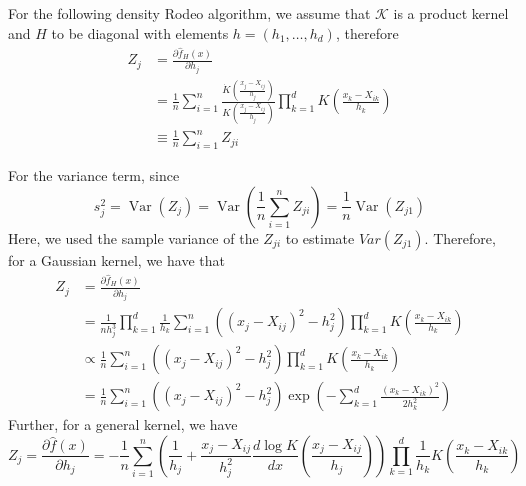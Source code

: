 For the following density Rodeo algorithm, we assume that $\mathcal{K}$ is a product kernel and $H$ to be diagonal with elements $h = (h_1, \dots, h_d)$, therefore
\begin{equation}
    \begin{split} 
        Z_{j} 
        & =\frac{\partial \hat{f}_{H}(x)}{\partial h_{j}} \\ 
        &=\frac{1}{n} \sum_{i=1}^{n} \frac{\dot{K}\left(\frac{x_{j}-X_{i j}}{h_{j}}\right)}{K\left(\frac{x_{j}-X_{i j}}{h_{j}}\right)} \prod_{k=1}^{d} K\left(\frac{x_{k}-X_{i k}}{h_{k}}\right) \\ 
        & \equiv \frac{1}{n} \sum_{i=1}^{n} Z_{j i} 
    \end{split}
\end{equation}

For the variance term, since 
\begin{equation}
    \label{eq:sj}
    s_{j}^{2}=\operatorname{Var}\left(Z_{j}\right)=\operatorname{Var}\left(\frac{1}{n} \sum_{i=1}^{n} Z_{j i}\right)=\frac{1}{n} \operatorname{Var}\left(Z_{j 1}\right)
\end{equation}
Here, we used the sample variance of the $Z_{ji}$ to estimate $Var(Z_{j1})$. 
Therefore, for a Gaussian kernel, we have that
\begin{equation}
    \label{eq:zj}
    \begin{split} 
        Z_{j} 
        &=\frac{\partial \hat{f}_{H}(x)}{\partial h_{j}} \\ 
        &=\frac{1}{n h_{j}^{3}} \prod_{k=1}^{d} \frac{1}{h_{k}} \sum_{i=1}^{n}\left(\left(x_{j}-X_{i j}\right)^{2}-h_{j}^{2}\right) \prod_{k=1}^{d} K\left(\frac{x_{k}-X_{i k}}{h_{k}}\right) \\ 
        & \propto \frac{1}{n} \sum_{i=1}^{n}\left(\left(x_{j}-X_{i j}\right)^{2}-h_{j}^{2}\right) \prod_{k=1}^{d} K\left(\frac{x_{k}-X_{i k}}{h_{k}}\right) \\ 
        &=\frac{1}{n} \sum_{i=1}^{n}\left(\left(x_{j}-X_{i j}\right)^{2}-h_{j}^{2}\right) \exp \left(-\sum_{k=1}^{d} \frac{\left(x_{k}-X_{i k}\right)^{2}}{2 h_{k}^{2}}\right) 
    \end{split}
\end{equation}
Further, for a general kernel, we have
\begin{equation}
    Z_{j} 
    = \frac{\partial \hat{f}(x)}{\partial h_{j}}
    = - \frac{1}{n} \sum_{i=1}^{n}\left(\frac{1}{h_{j}}+\frac{x_{j}-X_{i j}}{h_{j}^{2}} \frac{d \log K}{d x}\left(\frac{x_{j}-X_{i j}}{h_{j}}\right)\right) \prod_{k=1}^{d} \frac{1}{h_{k}} K\left(\frac{x_{k}-X_{i k}}{h_{k}}\right)
\end{equation}

